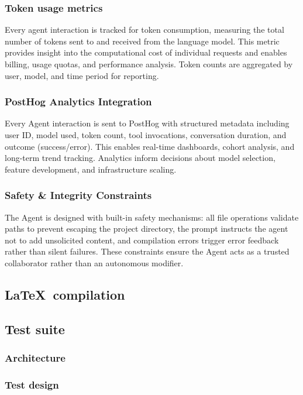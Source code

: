 \subsubsection{Token usage metrics}

Every agent interaction is tracked for token consumption, measuring the total number of tokens sent to and received from the language model.
This metric provides insight into the computational cost of individual requests and enables billing, usage quotas, and performance analysis.
Token counts are aggregated by user, model, and time period for reporting.

\subsubsection{PostHog Analytics Integration}

Every Agent interaction is sent to PostHog with structured metadata including user ID, model used, token count, tool invocations, conversation duration, and outcome (success/error). This enables real-time dashboards, cohort analysis, and long-term trend tracking. Analytics inform decisions about model selection, feature development, and infrastructure scaling.

\subsubsection{Safety \& Integrity Constraints}

The Agent is designed with built-in safety mechanisms: all file operations validate paths to prevent escaping the project directory, the prompt instructs the agent not to add unsolicited content, and compilation errors trigger error feedback rather than silent failures. These constraints ensure the Agent acts as a trusted collaborator rather than an autonomous modifier.

\subsection{\LaTeX\ compilation}

\subsection{Test suite}

\subsubsection{Architecture}
\subsubsection{Test design}


